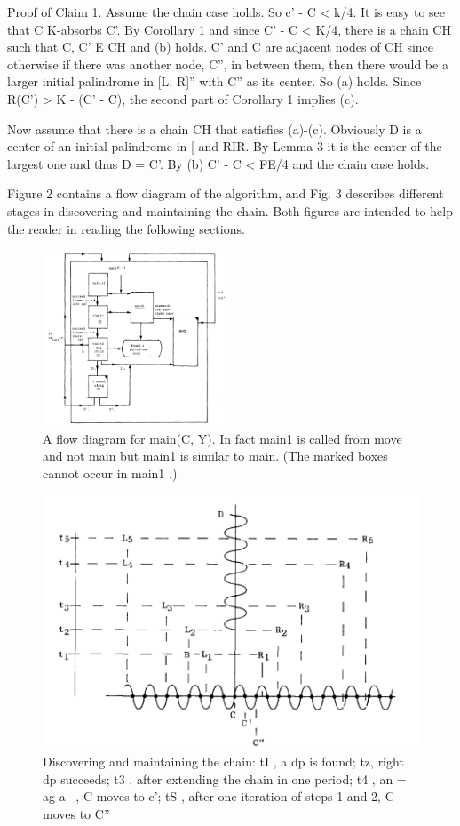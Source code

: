 \documentclass[11pt,a4paper]{report}
\begin{document}
Proof of Claim 1. Assume the chain case holds. So c’ - C < k/4. It is easy to see
that C K-absorbs C’. By Corollary 1 and since C’ - C < K/4, there is a chain CH such
that C, C’ E CH and (b) holds. C’ and C are adjacent nodes of CH since otherwise if
there was another node, C”, in between them, then there would be a larger initial palindrome in [L, R]” with C” as its center. So (a) holds. Since R(C’) > K - (C’ - C), the
second part of Corollary 1 implies (c).

Now assume that there is a chain CH that satisfies (a)-(c). Obviously D is a center of an
initial palindrome in [ and  RIR. By Lemma 3 it is the center of the largest one and thus
D = C’. By (b) C’ - C < FE/4 and the chain case holds. 

Figure 2 contains a flow diagram of the algorithm, and Fig. 3 describes different
stages in discovering and maintaining the chain. Both figures are intended to help the
reader in reading the following sections.

\begin{figure}[h]
    \centerline{\includegraphics[width=0.5\textwidth]{./images/2.png}}
    \caption{A flow diagram for main(C, Y). In fact main1 is called from move and not main but main1
    is similar to main. (The marked boxes cannot occur in main1 .) }
    \label{fig}
\end{figure}
\begin{figure}[h]
    \centerline{\includegraphics{./images/3.png}}
    \caption{Discovering and maintaining the chain: tI , a dp is found; tz, right dp succeeds;
    t3 , after extending the chain in one period; t4 , an = ag a~ , C moves to c’; tS , after one iteration
    of steps 1 and 2, C moves to C”}
    \label{fig}
\end{figure}
\end{document}
